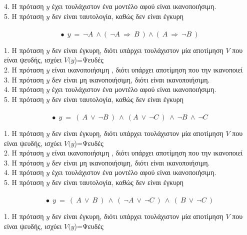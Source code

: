 \documentclass[10pt]{article}
\begin{document}
4. Η πρόταση $y$ έχει τουλάχιστον ένα μοντέλο αφού είναι ικανοποιήσιμη. \\

5. Η πρόταση $y$ δεν είναι ταυτολογία, καθώς δεν είναι έγκυρη
\\ \\

\[
\bullet \ \ y \ = \  \neg A \ \wedge ( \ \neg A \ \Rightarrow \  B \ ) \wedge ( \ A \ \Rightarrow \  \neg B \ ) \]

1. Η πρόταση $y$ δεν είναι έγκυρη, διότι υπάρχει τουλάχιστον μία αποτίμηση $V$ που είναι ψευδής, ισχύει $V(y$)=Ψευδές \\

2. Η πρόταση $y$ είναι ικανοποιήσιμη , διότι υπάρχει αποτίμηση  που την ικανοποιεί\\

3. Η πρόταση $y$ δεν είναι μη ικανοποιήσιμη, διότι είναι ικανοποιήσιμη. \\

4. Η πρόταση $y$ έχει τουλάχιστον ένα μοντέλο αφού είναι ικανοποιήσιμη. \\

5. Η πρόταση $y$ δεν είναι ταυτολογία, καθώς δεν είναι έγκυρη
\\ \\

\[
\bullet \ \ y \ = \ ( \ A \ \vee \ \neg B \ ) \ \wedge \ ( A \ 
\vee \ \neg C \ ) \ \wedge \ \neg B \ \wedge \ \neg C \]

1. Η πρόταση $y$ δεν είναι έγκυρη, διότι υπάρχει τουλάχιστον μία αποτίμηση $V$ που είναι ψευδής, ισχύει $V(y$)=Ψευδές \\

2. Η πρόταση $y$ είναι ικανοποιήσιμη , διότι υπάρχει αποτίμηση  που την ικανοποιεί\\

3. Η πρόταση $y$ δεν είναι μη ικανοποιήσιμη, διότι είναι ικανοποιήσιμη. \\

4. Η πρόταση $y$ έχει τουλάχιστον ένα μοντέλο αφού είναι ικανοποιήσιμη. \\

5. Η πρόταση $y$ δεν είναι ταυτολογία, καθώς δεν είναι έγκυρη
\\ \\

\[
\bullet \ \ y \ = \ ( \ A \ \vee \  B \ ) \ \wedge \ ( \ \neg A \ 
\vee \ \neg C \ ) \ \wedge \ ( \ B \ \vee \ \neg C \ ) \]


1. Η πρόταση $y$ δεν είναι έγκυρη, διότι υπάρχει τουλάχιστον μία αποτίμηση $V$ που είναι ψευδής, ισχύει $V(y$)=Ψευδές \\
\end{document}
